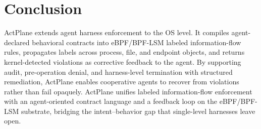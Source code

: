 \section{Conclusion}

ActPlane extends agent harness enforcement to the OS level. It compiles
agent-declared behavioral contracts into eBPF/BPF-LSM labeled information-flow
rules, propagates labels across process, file, and endpoint objects, and
returns kernel-detected violations as corrective feedback to the agent. By
supporting audit, pre-operation denial, and harness-level termination with
structured remediation, ActPlane enables cooperative agents to recover from
violations rather than fail opaquely. ActPlane unifies labeled information-flow
enforcement with an agent-oriented contract language and a feedback loop on
the eBPF/BPF-LSM substrate, bridging the intent--behavior gap that
single-level harnesses leave open.
